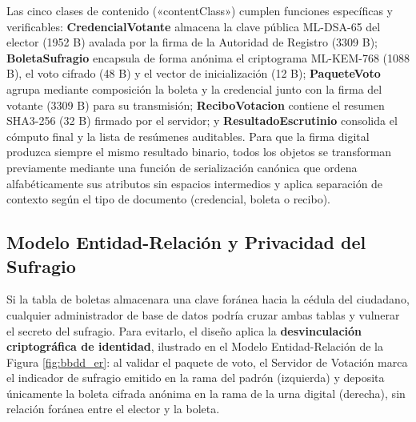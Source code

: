 Las cinco clases de contenido («contentClass») cumplen funciones específicas y verificables: \textbf{CredencialVotante} almacena la clave pública ML-DSA-65 del elector (1952 B) avalada por la firma de la Autoridad de Registro (3309 B); \textbf{BoletaSufragio} encapsula de forma anónima el criptograma ML-KEM-768 (1088 B), el voto cifrado (48 B) y el vector de inicialización (12 B); \textbf{PaqueteVoto} agrupa mediante composición la boleta y la credencial junto con la firma del votante (3309 B) para su transmisión; \textbf{ReciboVotacion} contiene el resumen SHA3-256 (32 B) firmado por el servidor; y \textbf{ResultadoEscrutinio} consolida el cómputo final y la lista de resúmenes auditables. Para que la firma digital produzca siempre el mismo resultado binario, todos los objetos se transforman previamente mediante una función de serialización canónica que ordena alfabéticamente sus atributos sin espacios intermedios y aplica separación de contexto según el tipo de documento (credencial, boleta o recibo).

\subsection{Modelo Entidad-Relación y Privacidad del Sufragio}

Si la tabla de boletas almacenara una clave foránea hacia la cédula del ciudadano, cualquier administrador de base de datos podría cruzar ambas tablas y vulnerar el secreto del sufragio. Para evitarlo, el diseño aplica la \textbf{desvinculación criptográfica de identidad}, ilustrado en el Modelo Entidad-Relación de la Figura \ref{fig:bbdd_er}: al validar el paquete de voto, el Servidor de Votación marca el indicador de sufragio emitido en la rama del padrón (izquierda) y deposita únicamente la boleta cifrada anónima en la rama de la urna digital (derecha), sin relación foránea entre el elector y la boleta.

